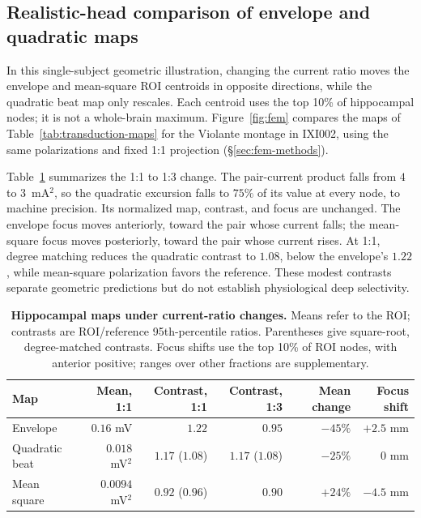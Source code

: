\documentclass[11pt,a4paper]{article}
\begin{document}
\subsection{Realistic-head comparison of envelope and quadratic maps}\label{sec:fem-results}
In this single-subject geometric illustration, changing the current ratio
moves the envelope and mean-square ROI centroids in opposite directions,
while the quadratic beat map only rescales. Each centroid uses the top 10\%
of hippocampal nodes; it is not a whole-brain maximum.
Figure~\ref{fig:fem} compares the maps of Table~\ref{tab:transduction-maps}
for the Violante montage in IXI002, using the same polarizations and fixed
1:1 projection (\S\ref{sec:fem-methods}).

Table~\ref{tab:fem-summary} summarizes the 1:1 to 1:3 change. The pair-current
product falls from $4$ to $3$~mA$^2$, so the quadratic excursion falls to $75\%$
of its value at every node, to machine precision. Its normalized map, contrast, and focus
are unchanged. The envelope focus moves anteriorly, toward the pair whose current
falls; the mean-square focus moves posteriorly, toward the pair whose current rises.
At 1:1, degree matching reduces the quadratic contrast to $1.08$, below the
envelope's $1.22$, while mean-square polarization favors the reference. These modest contrasts
separate geometric predictions but do not establish physiological deep selectivity.

\begin{table}[htbp]
\centering\small
\caption{\textbf{Hippocampal maps under current-ratio changes.} Means refer to the
ROI; contrasts are ROI/reference 95th-percentile ratios. Parentheses give
square-root, degree-matched contrasts. Focus shifts use the top 10\% of ROI
nodes, with anterior positive; ranges over other fractions are supplementary.}
\label{tab:fem-summary}
\begin{tabular}{@{}lrrrrr@{}}
\toprule
Map & Mean, 1:1 & Contrast, 1:1 & Contrast, 1:3 & Mean change & Focus shift\\
\midrule
Envelope & $0.16$ mV & $1.22$ & $0.95$ & $-45\%$ & $+2.5$ mm\\
Quadratic beat & $0.018$ mV$^2$ & $1.17$ ($1.08$) & $1.17$ ($1.08$) & $-25\%$ & $0$ mm\\
Mean square & $0.0094$ mV$^2$ & $0.92$ ($0.96$) & $0.90$ & $+24\%$ & $-4.5$ mm\\
\bottomrule
\end{tabular}
\end{table}
\end{document}
